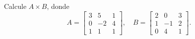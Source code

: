 \begin{ejercicio}
Calcule $A \times B$, donde
\[
A=\begin{bmatrix} 3 & 5 & 1 \\ 0 & -2 & 4 \\ 1 & 1 & 1 \end{bmatrix}, \quad
B=\begin{bmatrix} 2 & 0 & 3 \\ 1 & -1 & 2 \\ 0 & 4 & 1 \end{bmatrix}.
\]
\end{ejercicio}
\muestraSolucion{
\[
AB=\begin{bmatrix} 11 & -1 & 20 \\ -2 & 18 & 0 \\ 3 & 3 & 6 \end{bmatrix}.
\]
}
